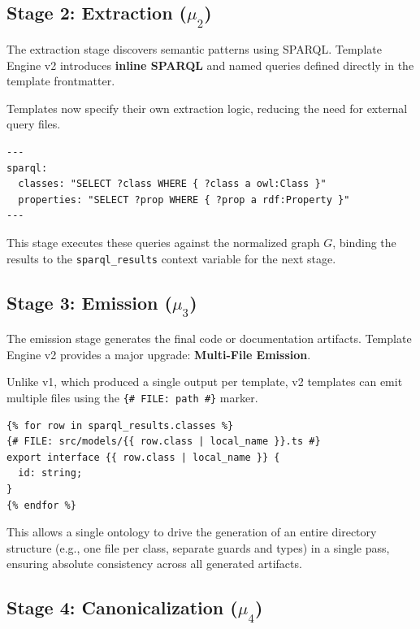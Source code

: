 \subsection{Stage 2: Extraction (\(\mu_2\))}

The extraction stage discovers semantic patterns using SPARQL. Template Engine v2 introduces \textbf{inline SPARQL} and named queries defined directly in the template frontmatter.

\begin{definition}
Templates now specify their own extraction logic, reducing the need for external query files.
\begin{verbatim}
---
sparql:
  classes: "SELECT ?class WHERE { ?class a owl:Class }"
  properties: "SELECT ?prop WHERE { ?prop a rdf:Property }"
---
\end{verbatim}
\end{definition}

This stage executes these queries against the normalized graph $G$, binding the results to the \texttt{sparql\_results} context variable for the next stage.

\subsection{Stage 3: Emission (\(\mu_3\))}

The emission stage generates the final code or documentation artifacts. Template Engine v2 provides a major upgrade: \textbf{Multi-File Emission}.

Unlike v1, which produced a single output per template, v2 templates can emit multiple files using the \texttt{\{# FILE: path \#\}} marker.

\begin{verbatim}
{% for row in sparql_results.classes %}
{# FILE: src/models/{{ row.class | local_name }}.ts #}
export interface {{ row.class | local_name }} {
  id: string;
}
{% endfor %}
\end{verbatim}

This allows a single ontology to drive the generation of an entire directory structure (e.g., one file per class, separate guards and types) in a single pass, ensuring absolute consistency across all generated artifacts.

\subsection{Stage 4: Canonicalization (\(\mu_4\))}

